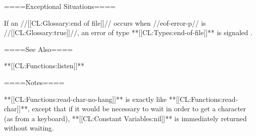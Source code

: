 ====Exceptional Situations====

If an //[[CL:Glossary:end of file]]// occurs when //eof-error-p// is //[[CL:Glossary:true]]//, an error of type **[[CL:Types:end-of-file]]** is signaled .

====See Also====

**[[CL:Functions:listen]]**

====Notes====

**[[CL:Functions:read-char-no-hang]]** is exactly like **[[CL:Functions:read-char]]**, except that if it would be necessary to wait in order to get a character (as from a keyboard), **[[CL:Constant Variables:nil]]** is immediately returned without waiting.

